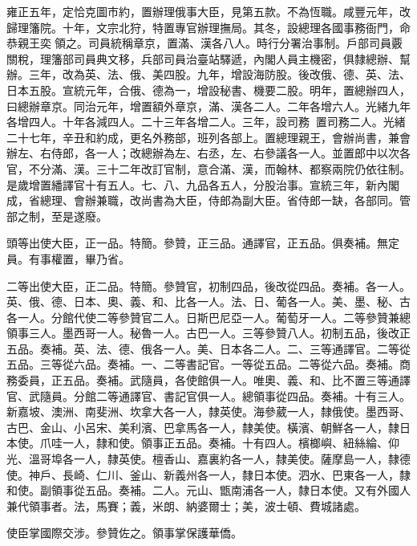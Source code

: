 \begin{pinyinscope}
雍正五年，定恰克圖市約，置辦理俄事大臣，見第五款。不為恆職。咸豐元年，改歸理籓院。十年，文宗北狩，特置專官辦理撫局。其冬，設總理各國事務衙門，命恭親王奕領之。司員統稱章京，置滿、漢各八人。時行分署治事制。戶部司員覈關稅，理籓部司員典文移，兵部司員治臺站驛遞，內閣人員主機密，俱隸總辦、幫辦。三年，改為英、法、俄、美四股。九年，增設海防股。後改俄、德、英、法、日本五股。宣統元年，合俄、德為一，增設秘書、機要二股。明年，置總辦四人，曰總辦章京。同治元年，增置額外章京，滿、漢各二人。二年各增六人。光緒九年各增四人。十年各減四人。二十三年各增二人。三年，設司務，置司務二人。光緒二十七年，辛丑和約成，更名外務部，班列各部上。置總理親王，會辦尚書，兼會辦左、右侍郎，各一人；改總辦為左、右丞，左、右參議各一人。並置郎中以次各官，不分滿、漢。三十二年改訂官制，意合滿、漢，而翰林、都察兩院仍依往制。是歲增置繙譯官十有五人。七、八、九品各五人，分股治事。宣統三年，新內閣成，省總理、會辦兼職，改尚書為大臣，侍郎為副大臣。省侍郎一缺，各部同。管部之制，至是遂廢。

頭等出使大臣，正一品。特簡。參贊，正三品。通譯官，正五品。俱奏補。無定員。有事權置，畢乃省。

二等出使大臣，正二品。特簡。參贊官，初制四品，後改從四品。奏補。各一人。英、俄、德、日本、奧、義、和、比各一人。法、日、葡各一人。美、墨、秘、古各一人。分館代使二等參贊官二人。日斯巴尼亞一人。葡萄牙一人。二等參贊兼總領事三人。墨西哥一人。秘魯一人。古巴一人。三等參贊八人。初制五品，後改正五品。奏補。英、法、德、俄各一人。美、日本各二人。二、三等通譯官。二等從五品。三等從六品。奏補。一、二等書記官。一等從五品。二等從六品。奏補。商務委員，正五品。奏補。武隨員，各使館俱一人。唯奧、義、和、比不置三等通譯官、武隨員。分館二等通譯官、書記官俱一人。總領事從四品。奏補。十有三人。新嘉坡、澳洲、南斐洲、坎拿大各一人，隸英使。海參葳一人，隸俄使。墨西哥、古巴、金山、小呂宋、美利濱、巴拿馬各一人，隸美使。橫濱、朝鮮各一人，隸日本使。爪哇一人，隸和使。領事正五品。奏補。十有四人。檳榔嶼、紐絲綸、仰光、溫哥埠各一人，隸英使。檀香山、嘉裏約各一人，隸美使。薩摩島一人，隸德使。神戶、長崎、仁川、釜山、新義州各一人，隸日本使。泗水、巴東各一人，隸和使。副領事從五品。奏補。二人。元山、甑南浦各一人，隸日本使。又有外國人兼代領事者。法，馬賽；義，米朗、納婆爾士；美，波士頓、費城諸處。

使臣掌國際交涉。參贊佐之。領事掌保護華僑。


\end{pinyinscope}
